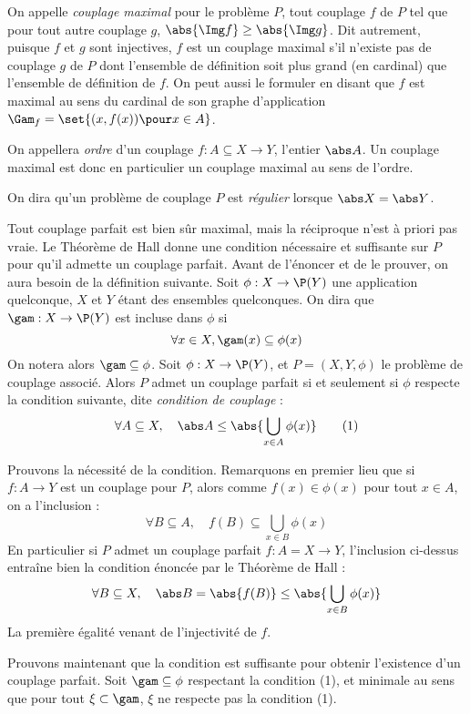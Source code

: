 On appelle \emph{couplage maximal} pour le problème $P$, tout couplage $f$ de $P$ tel que pour tout autre couplage $g$, $\abs{\Img f} \geq \abs{\Img g}$. Dit autrement, puisque $f$ et $g$ sont injectives, $f$ est un couplage maximal s'il n'existe pas de couplage $g$ de $P$ dont l'ensemble de définition soit plus grand (en cardinal) que l'ensemble de définition de $f$. On peut aussi le formuler en disant que $f$ est maximal au sens du cardinal de son graphe d'application $\Gam_f = \set{(x,f(x)) \pour x \in A}$.

On appellera \emph{ordre} d'un couplage $f : A \subseteq X \to Y$, l'entier $\abs A$. Un couplage maximal est donc en particulier un couplage maximal au sens de l'ordre.

On dira qu'un problème de couplage $P$ est \emph{régulier} lorsque $\abs X = \abs Y$.
\SEP

Tout couplage parfait est bien sûr maximal, mais la réciproque n'est à priori pas vraie. Le Théorème de Hall donne une condition nécessaire et suffisante sur $P$ pour qu'il admette un couplage parfait. Avant de l'énoncer et de le prouver, on aura besoin de la définition suivante.
\SEP\jdefi Soit $\phi : X \to \P (Y)$ une application quelconque, $X$ et $Y$ étant des ensembles quelconques. On dira que $\gam : X \to \P (Y)$ est incluse dans $\phi$ si
\[ \forall x \in X, \gam(x) \subseteq \phi(x) \]
On notera alors $\gam \subseteq \phi$.
\SEP{} Soit $\phi : X \to \P(Y)$, et $P = (X,Y,\phi)$ le problème de couplage associé. Alors $P$ admet un couplage parfait si et seulement si $\phi$ respecte la condition suivante, dite \emph{condition de couplage} :
\[ \forall A \subseteq X, \quad \abs A \leq \abs{ \bigcup _{x \in A} \phi(x) } \tag{1} \]
\SEP\jpreuve

    Prouvons la nécessité de la condition. Remarquons en premier lieu que si $f : A \to Y $ est un couplage pour $P$, alors comme $f(x) \in \phi(x)$ pour tout $x \in A$, on a l'inclusion :
    \[ \forall B \subseteq A, \quad f(B) \subseteq \bigcup _{x \in B} \phi(x) \]
    En particulier si $P$ admet un couplage parfait $f : A = X \to Y$, l'inclusion ci-dessus entraîne bien la condition énoncée par le Théorème de Hall :
    \[ \forall B \subseteq X, \quad \abs B = \abs{f(B)} \leq \abs{ \bigcup _{x \in B} \phi(x) } \]
    La première égalité venant de l'injectivité de $f$.
    \medskip
    
    Prouvons maintenant que la condition est suffisante pour obtenir l'existence d'un couplage parfait. Soit $\gam \subseteq \phi$ respectant la condition (1), et minimale au sens que pour tout $\xi \subset \gam$, $\xi$ ne respecte pas la condition (1).
    
